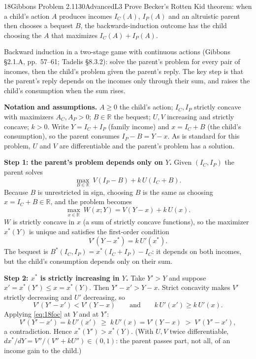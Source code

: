 \begin{exsol}{18}{Gibbons Problem 2.1}{130}{Advanced}{L3}
\asked Prove Becker's Rotten Kid theorem: when a child's action $A$ produces incomes
$I_C(A)$, $I_P(A)$ and an altruistic parent then chooses a bequest $B$, the backwards-induction
outcome has the child choosing the $A$ that maximizes $I_C(A) + I_P(A)$.

\method Backward induction in a two-stage game with continuous actions (Gibbons \S2.1.A,
pp.~57--61; Tadelis \S8.3.2): solve the parent's problem for every pair of incomes, then the
child's problem given the parent's reply. The key step is that the parent's reply depends on the
incomes only through their sum, and raises the child's consumption when the sum rises.

\solution
\textbf{Notation and assumptions.} $A \ge 0$ the child's action; $I_C, I_P$ strictly concave with
maximizers $A_C, A_P > 0$; $B \in \mathbb{R}$ the bequest; $U, V$ increasing and strictly concave;
$k > 0$. Write $Y = I_C + I_P$ (family income) and $x = I_C + B$ (the child's consumption), so the
parent consumes $I_P - B = Y - x$. As is standard for this problem, $U$ and $V$ are
differentiable and the parent's problem has a solution.

\textbf{Step 1: the parent's problem depends only on $Y$.} Given $(I_C, I_P)$ the parent solves
\[
  \max_{B \in \mathbb{R}}\ V(I_P - B) + k\,U(I_C + B).
\]
Because $B$ is unrestricted in sign, choosing $B$ is the same as choosing $x = I_C + B \in \mathbb{R}$,
and the problem becomes
\begin{equation}
  \max_{x \in \mathbb{R}}\ W(x; Y) = V(Y - x) + k\,U(x). \label{eq:18W}
\end{equation}
$W$ is strictly concave in $x$ (a sum of strictly concave functions), so the maximizer $x^*(Y)$ is
unique and satisfies the first-order condition
\begin{equation}
  V'(Y - x^*) = k\,U'(x^*). \label{eq:18foc}
\end{equation}
The bequest is $B^*(I_C, I_P) = x^*(I_C + I_P) - I_C$: it depends on both incomes, but the child's
consumption depends only on their sum.

\textbf{Step 2: $x^*$ is strictly increasing in $Y$.} Take $Y' > Y$ and suppose
$x' = x^*(Y') \le x = x^*(Y)$. Then $Y' - x' > Y - x$. Strict concavity makes $V'$ strictly
decreasing and $U'$ decreasing, so
\[
  V'(Y' - x') < V'(Y - x) \qquad\text{and}\qquad k\,U'(x') \ge k\,U'(x).
\]
Applying \eqref{eq:18foc} at $Y$ and at $Y'$:
\[
  V'(Y' - x') = k\,U'(x') \;\ge\; k\,U'(x) = V'(Y - x) \;>\; V'(Y' - x'),
\]
a contradiction. Hence $x^*(Y') > x^*(Y)$. (With $U, V$ twice differentiable,
$dx^*/dY = V''/(V'' + kU'') \in (0,1)$: the parent passes part, not all, of an income gain to the
child.)


\end{exsol}

